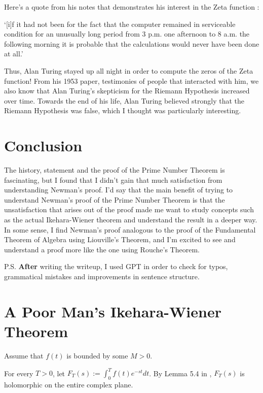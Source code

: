 \documentclass{article}
\theoremstyle{definition}
\begin{document}
Here's a quote from his notes that demonstrates his interest in the Zeta function \cite{hejhal_alan_2012}:

`[i]f it had not been for the fact that the computer remained in serviceable condition for an unusually long period from 3 p.m. one afternoon to 8 a.m. the
 following morning it is probable that the calculations would never have been done at all.'

Thus, Alan Turing stayed up all night in order to compute the zeros of the Zeta function! From his 1953 paper,
testimonies of people that interacted with him, we also know that Alan Turing's skepticism for the Riemann Hypothesis
increased over time. Towards the end of his life, Alan Turing believed strongly that the Riemann Hypothesis was false,
which I thought was particularly interesting.

\section{Conclusion}

The history, statement and the proof of the Prime Number Theorem is fascinating, but
I found that I didn't gain that much satisfaction from understanding Newman's proof. I'd say that the main benefit
of trying to understand Newman's proof of the Prime Number Theorem is that the unsatisfaction that arises out of 
the proof made me want to study concepts such as the actual Ikehara-Wiener theorem and understand the result in a
deeper way. In some sense, I find Newman's proof analogous to the proof of the Fundamental Theorem of Algebra
using Liouville's Theorem, and I'm excited to see and understand a proof more like the one using Rouche's Theorem.

\newpage

 


P.S. \textbf{After} writing the writeup, I used GPT in order to check for typos, grammatical 
mistakes and improvements in sentence structure.

\newpage

\appendix

\section{A Poor Man's Ikehara-Wiener Theorem}

Assume that $ f(t) $ is bounded by some $ M > 0 $.

For every $ T > 0 $, let $ F_{T}(s) := \int_{0}^{T} f(t)e^{-st}dt $.
By Lemma 5.4 in \cite{shakarchi_complex_nodate}, $ F_{T}(s) $ is holomorphic on the entire complex plane.
\end{document}
